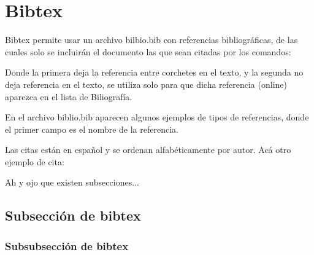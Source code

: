\section{Bibtex}\label{cap:antecedentes:bibtex}
Bibtex permite usar un archivo bilbio.bib con referencias bibliográficas, de las cuales solo se incluirán el documento las que sean citadas por los comandos:

\cite{Bdo}
\nocite{online}

Donde la primera deja la referencia entre corchetes en el texto, y la segunda no deja referencia en el texto, se utiliza solo para que dicha referencia (online) aparezca en el lista de Biliografía.

En el archivo biblio.bib aparecen algunos ejemplos de tipos de referencias, donde el primer campo es el nombre de la referencia.

Las citas están en español y se ordenan alfabéticamente por autor. Acá otro ejemplo de cita: \cite{Palma}

Ah y ojo que existen subsecciones...

\subsection{Subsección de bibtex}\label{cap:antecedentes:bibtex:subseccion}

\subsubsection{Subsubsección de bibtex}\label{cap:antecedentes:bibtex:subseccion:subsubsection}


